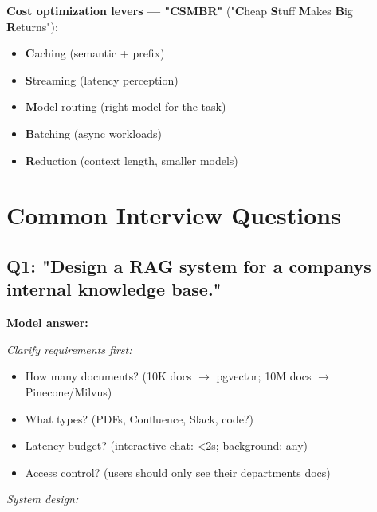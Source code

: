 \documentclass[11pt]{article}
\providecommand{\tightlist}{\setlength{\itemsep}{1pt}\setlength{\parskip}{0pt}}
\begin{document}
\textbf{Cost optimization levers --- "CSMBR"} ("\textbf{C}heap \textbf{S}tuff \textbf{M}akes \textbf{B}ig \textbf{R}eturns"):

\begin{itemize}
\tightlist
\item
  \textbf{C}aching (semantic + prefix)
\item
  \textbf{S}treaming (latency perception)
\item
  \textbf{M}odel routing (right model for the task)
\item
  \textbf{B}atching (async workloads)
\item
  \textbf{R}eduction (context length, smaller models)
\end{itemize}

\section{Common Interview Questions}\label{common-interview-questions}

\subsection{Q1: "Design a RAG system for a company\textquotesingle s internal knowledge base."}\label{q1-design-a-rag-system-for-a-companys-internal-knowledge-base}

\textbf{Model answer:}

\emph{Clarify requirements first:}

\begin{itemize}
\tightlist
\item
  How many documents? (10K docs \(\rightarrow\) pgvector; 10M docs \(\rightarrow\) Pinecone/Milvus)
\item
  What types? (PDFs, Confluence, Slack, code?)
\item
  Latency budget? (interactive chat: \textless2s; background: any)
\item
  Access control? (users should only see their department\textquotesingle s docs)
\end{itemize}

\emph{System design:}
\end{document}
